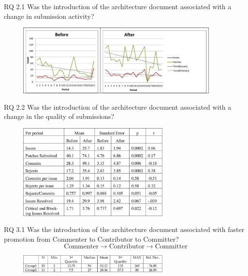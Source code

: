 \documentclass[t,14pt,mathserif]{beamer}
\begin{document}
\begin{frame}{RQ 2.1 Was the introduction of the architecture document associated with a change in submission activity?}
	
	\begin{figure}[!t]
		\centering
		\includegraphics[width=4.0in]{../img/issue-patch}
		\label{fig:issue-patch}
	\end{figure}
	
\end{frame}


\begin{frame}{RQ 2.2 Was the introduction of the architecture document associated with a change in the quality of submissions?}
	
	\begin{figure}[!t]
		\centering
		\includegraphics[width=3.0in]{../img/issue-quality-table}
		\label{fig:issue-quality-table}
	\end{figure}
	

\end{frame}



\begin{frame}{RQ 3.1 Was the introduction of the architecture document associated with faster promotion from Commenter to Contributor to Committer?}
	\begin{equation} \mathrm{Commenter} \to \mathrm{Contributor} \to \mathrm{Committer} \end{equation}

    \begin{figure}[!t]
    	\centering
    	\includegraphics[width=3.0in]{../img/promotion-table}
    	\label{fig:promotion-table}
    \end{figure}
	
\end{frame}
\end{document}
